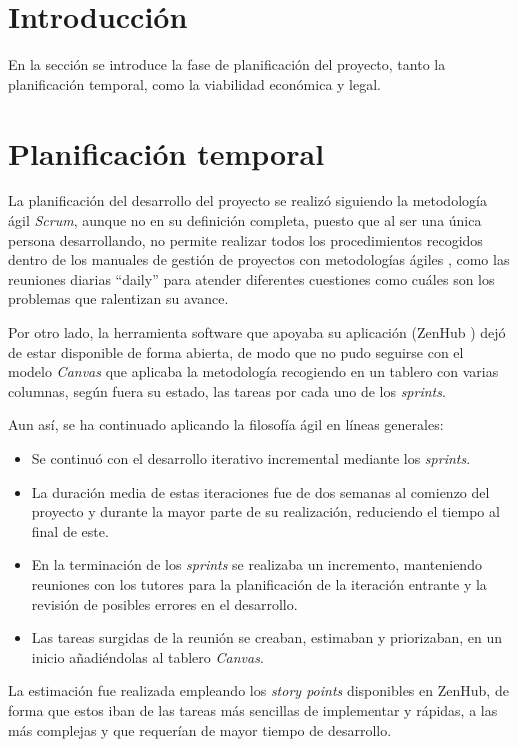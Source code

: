 
\section{Introducción}
En la sección se introduce la fase de planificación del proyecto, tanto la planificación temporal, como
la viabilidad económica y legal.

\section{Planificación temporal}
La planificación del desarrollo del proyecto se realizó siguiendo la metodología ágil \textit{Scrum}, aunque no en su definición completa, puesto
que al ser una única persona desarrollando, no permite realizar todos los procedimientos recogidos dentro de los manuales de gestión de proyectos
con metodologías ágiles \cite{book:palacio2021}, como las reuniones diarias ``daily'' para atender diferentes cuestiones como cuáles son los 
problemas que ralentizan su avance.

Por otro lado, la herramienta software que apoyaba su aplicación (ZenHub \cite{misc:zenhub2023}) dejó de estar disponible de forma abierta, de modo
que no pudo seguirse con el modelo \textit{Canvas} que aplicaba la metodología recogiendo en un tablero con varias columnas, según fuera su estado, las 
tareas por cada uno de los \textit{sprints}.

Aun así, se ha continuado aplicando la filosofía ágil en líneas generales:
\begin{itemize}
    \item Se continuó con el desarrollo iterativo incremental mediante los \textit{sprints}.
    \item La duración media de estas iteraciones fue de dos semanas al comienzo del proyecto y durante
        la mayor parte de su realización, reduciendo el tiempo al final de este.
    \item En la terminación de los \textit{sprints} se realizaba un incremento, manteniendo reuniones con los 
        tutores para la planificación de la iteración entrante y la revisión de posibles errores en el desarrollo.
    \item Las tareas surgidas de la reunión se creaban, estimaban y priorizaban, en un inicio añadiéndolas al tablero
        \textit{Canvas}.
\end{itemize}

La estimación fue realizada empleando los \textit{story points} disponibles en ZenHub, de forma que estos iban de las 
tareas más sencillas de implementar y rápidas, a las más complejas y que requerían de mayor tiempo
de desarrollo.

